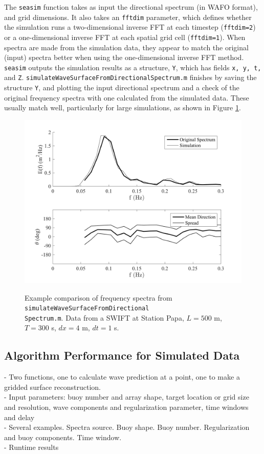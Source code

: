 \documentclass[11pt]{article}
\begin{document}
The \texttt{seasim} function takes as input the directional spectrum (in WAFO format), and grid dimensions.  It also takes an \texttt{fftdim} parameter, which defines whether the simulation runs a two-dimensional inverse FFT at each timestep (\texttt{fftdim=2}) or a one-dimensional inverse FFT at each spatial grid cell (\texttt{fftdim=1}).  When spectra are made from the simulation data, they appear to match the original (input) spectra better when using the one-dimensional inverse FFT method.  \texttt{seasim} outputs the simulation results as a structure, \texttt{Y}, which has fields \texttt{x, y, t,} and \texttt{Z}.  \texttt{simulateWaveSurfaceFromDirectionalSpectrum.m} finishes by saving the structure \texttt{Y}, and plotting the input directional spectrum and a check of the original frequency spectra with one calculated from the simulated data.  These usually match well, particularly for large simulations, as shown in Figure \ref{fig:FrequencySpectraComparison}.

\begin{figure}[t]
    \centering
    \noindent\includegraphics[width=5.5in]{FrequencySpectra.png}\\
   \vspace{-0in}\caption{Example comparison of frequency spectra from \texttt{simulateWaveSurfaceFromDirectional\\Spectrum.m}.  Data from a SWIFT at Station Papa, $L = 500$ m, $T = 300$ s, $dx = 4$ m, $dt = 1$ s.}\label{fig:FrequencySpectraComparison}
\end{figure}

\subsection{Algorithm Performance for Simulated Data}
- Two functions, one to calculate wave prediction at a point, one to make a gridded surface reconstruction.\\
- Input parameters: buoy number and array shape, target location or grid size and resolution, wave components and regularization parameter, time windows and delay\\
- Several examples.  Spectra source.  Buoy shape.  Buoy number.  Regularization and buoy components.  Time window.\\
- Runtime results\\
\end{document}
